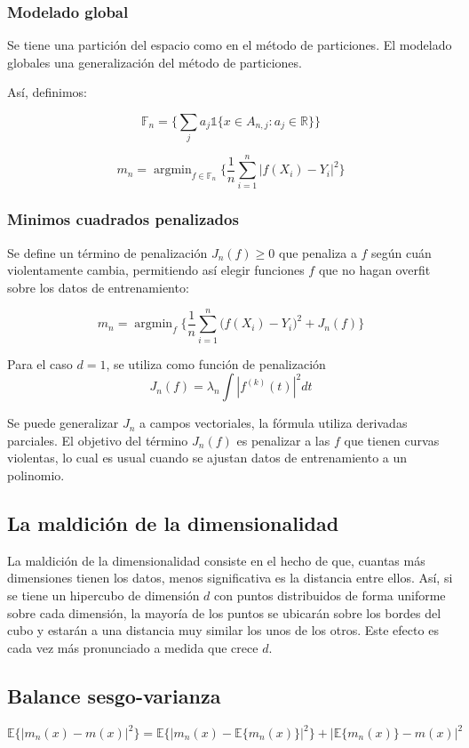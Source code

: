 \documentclass[12pt, a4paper]{article}
\begin{document}
\subsubsection{Modelado global}

Se tiene una partición del espacio como en el método de particiones. El modelado globales una generalización del método de particiones.

Así, definimos:

$$ \mathds{F}_n = \Bigg \{ \sum_{j} a_j \mathds{1} \{ x \in A_{n,j}: a_j \in \mathds{R} \} \Bigg \} $$

$$ m_n = \mathop{argmin}_{f\in \mathds{F}_n} \Bigg \{ \frac{1}{n} \sum_{i=1}^n | f(X_i)-Y_i |^2 \Bigg \} $$

\subsubsection{Minimos cuadrados penalizados}

Se define un término de penalización $J_n(f)\geq 0$ que penaliza a $f$ según cuán violentamente cambia, permitiendo así elegir funciones $f$ que no hagan overfit sobre los datos de entrenamiento:

$$ m_n=\mathop{argmin}_f \Bigg \{ \frac{1}{n} \sum_{i=1}^n \big (f(X_i)-Y_i \big )^2 + J_n(f) \Bigg \} $$

Para el caso $d=1$, se utiliza como función de penalización $$ J_n(f)=\lambda_n \int |f^{(k)}(t)|^2 dt $$

Se puede generalizar $J_n$ a campos vectoriales, la fórmula utiliza derivadas parciales. El objetivo del término $J_n(f)$ es penalizar a las $f$ que tienen curvas violentas, lo cual es usual cuando se ajustan datos de entrenamiento a un polinomio.

\subsection{La maldición de la dimensionalidad}

La maldición de la dimensionalidad consiste en el hecho de que, cuantas más dimensiones tienen los datos, menos significativa es la distancia entre ellos. Así, si se tiene un hipercubo de dimensión $d$ con puntos distribuidos de forma uniforme sobre cada dimensión, la mayoría de los puntos se ubicarán sobre los bordes del cubo y estarán a una distancia muy similar los unos de los otros. Este efecto es cada vez más pronunciado a medida que crece $d$.

\subsection{Balance sesgo-varianza}
$$ \mathds{E} \Big \{ |m_n(x)-m(x)|^2 \Big \} = \mathds{E} \Big \{ | m_n(x) - \mathds{E} \big \{ m_n(x) \big \} |^2  \Big \} + \Big | \mathds{E} \big \{m_n(x) \big \} -m(x) \Big |^2$$
\end{document}
